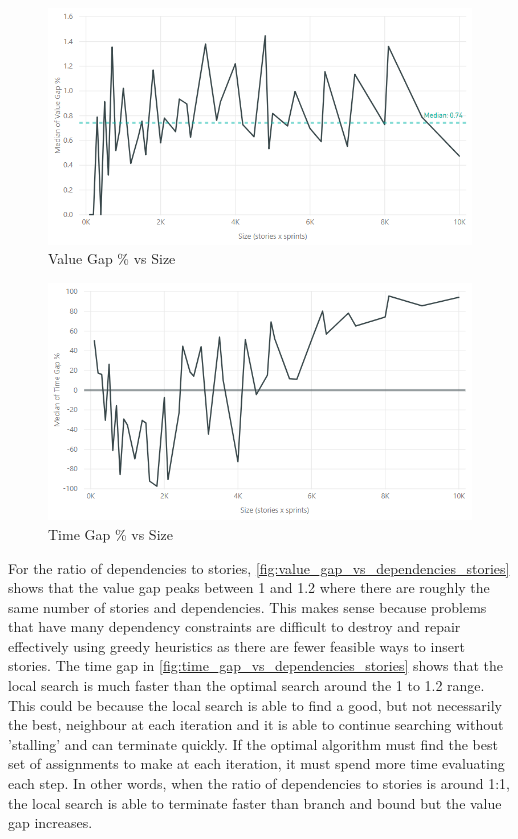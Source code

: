 \begin{figure}[h!]
    \centering
    \includegraphics[width=\textwidth]{Figures/Results/annealing_value_gap_size.png}
    \caption{Value Gap \% vs Size}
    \label{fig:value_gap_vs_size}
\end{figure}

\begin{figure}[h!]
    \centering
    \includegraphics[width=\textwidth]{Figures/Results/annealing_time_gap_size.png}
    \caption{Time Gap \% vs Size}
    \label{fig:time_gap_vs_size}
\end{figure}

For the ratio of dependencies to stories, \cref{fig:value_gap_vs_dependencies_stories} shows that the value gap peaks between 1 and 1.2 where there are roughly the same number of stories and dependencies. This makes sense because problems that have many dependency constraints are difficult to destroy and repair effectively using greedy heuristics as there are fewer feasible ways to insert stories. The time gap in \cref{fig:time_gap_vs_dependencies_stories} shows that the local search is much faster than the optimal search around the 1 to 1.2 range. This could be because the local search is able to find a good, but not necessarily the best, neighbour at each iteration and it is able to continue searching without 'stalling' and can terminate quickly. If the optimal algorithm must find the best set of assignments to make at each iteration, it must spend more time evaluating each step. In other words, when the ratio of dependencies to stories is around 1:1, the local search is able to terminate faster than branch and bound but the value gap increases.

